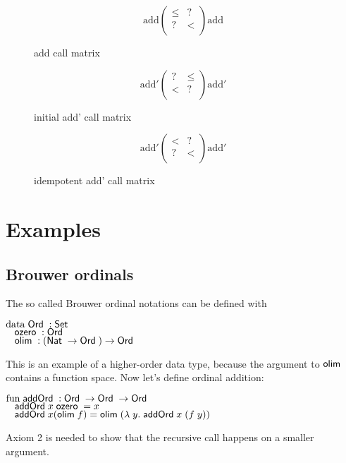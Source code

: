 \begin{figure}[p]
\[
\mathrm{add}\begin{pmatrix}

\leq & ? \\
?    & < \\

\end{pmatrix}\mathrm{add}
\]
\caption{add call matrix}
\end{figure}

\begin{figure}[p]

\[
\mathrm{add'} \begin{pmatrix}

? & \leq \\
< & ?   \\

\end{pmatrix} \mathrm{add'}
\]

\caption{initial add' call matrix}

\end{figure}

\begin{figure}[p]

\[
\mathrm{add'} \begin{pmatrix}

< & ?    \\
? & <    \\

\end{pmatrix} \mathrm{add'}
\] 

\caption{idempotent add' call matrix}

\end{figure}

\section{Examples}

\subsection{Brouwer ordinals}
The so called Brouwer ordinal notations can be defined with
\begin{bsp}
$\mathrm{data}\; \mathsf{Ord}\; : \mathsf{Set}$ \\
$\hspace*{3mm} \mathsf{ozero}\; : \mathsf{Ord}\; $\\
$\hspace*{3mm} \mathsf{olim}\; : (\mathsf{Nat}\; \rightarrow \mathsf{Ord}\; ) \rightarrow \mathsf{Ord}\; $
\end{bsp}
This is an example of a higher-order data type, because the argument to $\mathsf{olim}\;$ contains a function space.
Now let's define ordinal addition:
\begin{bsp}
$\mathrm{fun}\; \mathsf{addOrd}\; : \mathsf{Ord}\; \rightarrow \mathsf{Ord}\; \rightarrow \mathsf{Ord}\;$\\
$\hspace*{3mm} \mathsf{addOrd}\; x \; \mathsf{ozero}\; = x $\\
$\hspace*{3mm} \mathsf{addOrd}\; x (\mathsf{olim}\; f) = \mathsf{olim}\; ( \lambda\; y .\; \mathsf{addOrd}\;  x \; (f \; y))  $
\end{bsp}
Axiom 2 is needed to show that the recursive call happens on a smaller argument.

